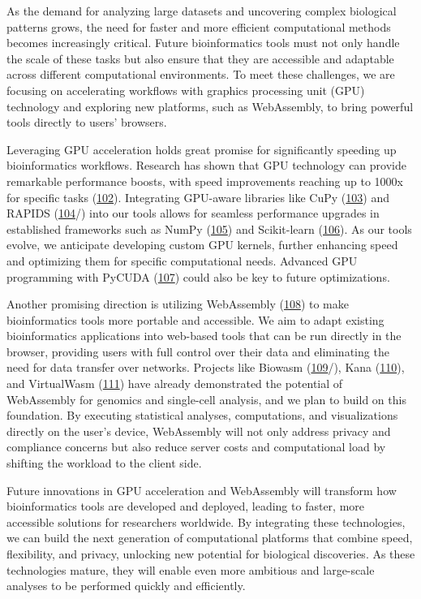 As the demand for analyzing large datasets and uncovering complex biological patterns grows, the need for faster and more efficient computational methods becomes increasingly critical.
Future bioinformatics tools must not only handle the scale of these tasks but also ensure that they are accessible and adaptable across different computational environments.
To meet these challenges, we are focusing on accelerating workflows with graphics processing unit (GPU) technology and exploring new platforms, such as WebAssembly, to bring powerful tools directly to users' browsers.

Leveraging GPU acceleration holds great promise for significantly speeding up bioinformatics workflows.
Research has shown that GPU technology can provide remarkable performance boosts, with speed improvements reaching up to 1000x for specific tasks (\protect\hyperlink{ref-1EIbaYHGq}{102}).
Integrating GPU-aware libraries like CuPy (\protect\hyperlink{ref-4iZVPVHz}{103}) and RAPIDS (\protect\hyperlink{ref-wPsNXL1Q}{104}/) into our tools allows for seamless performance upgrades in established frameworks such as NumPy (\protect\hyperlink{ref-1LexfAxj}{105}) and Scikit-learn (\protect\hyperlink{ref-AujvwLp6}{106}).
As our tools evolve, we anticipate developing custom GPU kernels, further enhancing speed and optimizing them for specific computational needs.
Advanced GPU programming with PyCUDA (\protect\hyperlink{ref-b5xmRoLZ}{107}) could also be key to future optimizations.

Another promising direction is utilizing WebAssembly (\protect\hyperlink{ref-ITQaZvrQ}{108}) to make bioinformatics tools more portable and accessible.
We aim to adapt existing bioinformatics applications into web-based tools that can be run directly in the browser, providing users with full control over their data and eliminating the need for data transfer over networks.
Projects like Biowasm (\protect\hyperlink{ref-Z0f406Zs}{109}/), Kana (\protect\hyperlink{ref-1DswCJYT0}{110}), and VirtualWasm (\protect\hyperlink{ref-WhJVE7a4}{111}) have already demonstrated the potential of WebAssembly for genomics and single-cell analysis, and we plan to build on this foundation.
By executing statistical analyses, computations, and visualizations directly on the user's device, WebAssembly will not only address privacy and compliance concerns but also reduce server costs and computational load by shifting the workload to the client side.

Future innovations in GPU acceleration and WebAssembly will transform how bioinformatics tools are developed and deployed, leading to faster, more accessible solutions for researchers worldwide.
By integrating these technologies, we can build the next generation of computational platforms that combine speed, flexibility, and privacy, unlocking new potential for biological discoveries.
As these technologies mature, they will enable even more ambitious and large-scale analyses to be performed quickly and efficiently.

